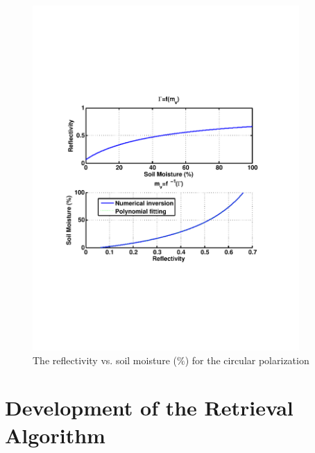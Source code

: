 \documentclass[draftcls,onecolumn]{IEEEtran}  %
\begin{document}
\begin{figure}[t!]
	\centering
	\includegraphics[width=4in]{pdf/gamma_vs_mv1.pdf}
	\caption{The reflectivity vs. soil moisture ($\%$) for the circular polarization}
	\centering
	\label{fig:reflect_mv}
\end{figure}



\section{Development of the Retrieval Algorithm}
\end{document}
